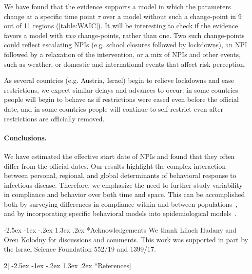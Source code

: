 \documentclass[12pt]{extarticle}
\makeatletter
\renewcommand\section{\@startsection {section}{1}{\z@}%
     {-2.5ex \@plus -1ex \@minus -.2ex}%
     {1.3ex \@plus.2ex}%
    {\Large\bfseries}}
\makeatother
\begin{document}
We have found that the evidence supports a model in which the parameters change at a specific time point $\tau$ over a model without such a change-point in 9 out of 11 regions (\autoref{table:WAIC}).
It will be interesting to check if the evidence favors a model with \emph{two} change-points, rather than one. 
Two such change-points could reflect escalating NPIs (e.g. school closures followed by lockdowns), an NPI followed by a relaxation of the intervention, or a mix of NPIs and other events, such as weather, or domestic and international events that affect risk perception.

As several countries (e.g. Austria, Israel) begin to relieve lockdowns and ease restrictions, we expect similar delays and advances to occur: in some countries people will begin to behave as if restrictions were eased even before the official date, and in some countries people will continue to self-restrict even after restrictions are officially removed.

\paragraph*{Conclusions.}
We have estimated the effective start date of NPIs and found that they often differ from the official dates.
Our results highlight the complex interaction between personal, regional, and global determinants of behavioral response to infectious disease.
Therefore, we emphasize the need to further study variability in compliance and behavior over both time and space. This can be accomplished both by surveying differences in compliance within and between populations~\citep{Atchison2020}, and by incorporating specific behavioral models into epidemiological models~\citep{Fenichela2011,Walters2013,Arthur2020}.

{\small
\section*{Acknowledgements}
We thank Lilach Hadany and Oren Kolodny for discussions and comments.
This work was supported in part by the Israel Science Foundation 552/19 and 1399/17.
}



\begin{multicols}{2}[\section*{References}]
\nolinenumbers

%

\end{multicols}
\end{document}
